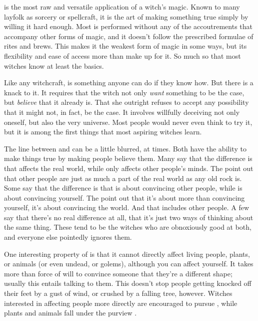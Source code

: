 
 is the most raw and versatile application of a witch's magic.
Known to many layfolk as sorcery or spellcraft, it is the art of making something true simply by willing it hard enough.
Most  is performed without any of the accoutrements that accompany other forms of magic, and it doesn't follow the prescribed formulae of rites and brews.
This makes it the weakest form of magic in some ways, but its flexibility and ease of access more than make up for it.
So much so that most witches know at least the basics.

Like any witchcraft,  is something anyone can do if they know how.
But there is a knack to it.
It requires that the witch not only \emph{want} something to be the case, but \emph{believe} that it already is.
That she outright refuses to accept any possibility that it might not, in fact, be the case.
It involves willfully deceiving not only oneself, but also the very universe.
Most people would never even think to try it, but it is among the first things that most aspiring witches learn.

The line between  and  can be a little blurred, at times.
Both have the ability to make things true by making people believe them.
Many  say that the difference is that  affects the real world, while  only affects other people's minds.
The  point out that other people are just as much a part of the real world as any old rock is.
Some  say that the difference is that  is about convincing other people, while  is about convincing yourself.
The  point out that it's about more than convincing yourself, it's about convincing the world.
And that includes other people.
A few say that there's no real difference at all, that it's just two ways of thinking about the same thing.
These tend to be the witches who are obnoxiously good at both, and everyone else pointedly ignores them.

One interesting property of  is that it cannot directly affect living people, plants, or animals (or even undead, or golems), although you can affect yourself.
It takes more than force of will to convince someone that they're a different shape; usually this entails talking to them.
This doesn't stop people getting knocked off their feet by a gust of wind, or crushed by a falling tree, however.
Witches interested in affecting people more directly are encouraged to pursue , while plants and animals fall under the purview .

